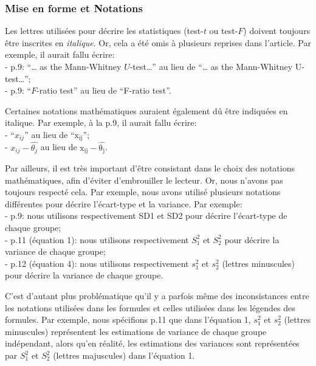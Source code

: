 \documentclass[
  12pt,
  french,
]{article}
\begin{document}
\hypertarget{mise-en-forme-et-notations}{%
\subsubsection{Mise en forme et
Notations}\label{mise-en-forme-et-notations}}

Les lettres utilisées pour décrire les statistiques (test-\(t\) ou
test-\(F\)) doivent toujours être inscrites en \emph{italique}. Or, cela
a été omis à plusieurs reprises dans l'article. Par exemple, il aurait
fallu écrire:\\
- p.9: ``\ldots{} as the Mann-Whitney \(U\)-test\ldots{}'' au lieu de
``\ldots{} as the Mann-Whitney U-test\ldots{}'';\\
- p.9: ``\(F\)-ratio test'' au lieu de ``F-ratio test''.

Certaines notations mathématiques auraient également dû être indiquées
en italique. Par exemple, à la p.9, il aurait fallu écrire:\\
- ``\(x_{ij}\)'' au lieu de ``\(\mathrm{x_{ij}}\)'';\\
- \textbar{}\(x_{ij}-\hat{\theta_j}\)\textbar{} au lieu de
\textbar{}\(\mathrm{x_{ij}-\hat{\theta_j}}\)\textbar.

Par ailleurs, il est très important d'être consistant dans le choix des
notations mathématiques, afin d'éviter d'embrouiller le lecteur. Or,
nous n'avons pas toujours respecté cela. Par exemple, nous avons utilisé
plusieurs notations différentes pour décrire l'écart-type et la
variance. Par exemple:\\
- p.9: nous utilisons respectivement SD1 et SD2 pour décrire
l'écart-type de chaque groupe;\\
- p.11 (équation 1): nous utilisons respectivement \(S^2_1\) et
\(S^2_2\) pour décrire la variance de chaque groupe;\\
- p.12 (équation 4): nous utilisons respectivement \(s^2_1\) et
\(s^2_2\) (lettres minuscules) pour décrire la variance de chaque
groupe.

C'est d'autant plus problématique qu'il y a parfois même des
inconsistances entre les notations utilisées dans les formules et celles
utilisées dans les légendes des formules. Par exemple, nous spécifions
p.11 que dans l'équation 1, \(s^2_1\) et \(s^2_2\) (lettres minuscules)
représentent les estimations de variance de chaque groupe indépendant,
alors qu'en réalité, les estimations des variances sont représentées par
\(S^2_1\) et \(S^2_2\) (lettres majuscules) dans l'équation 1.
\end{document}
